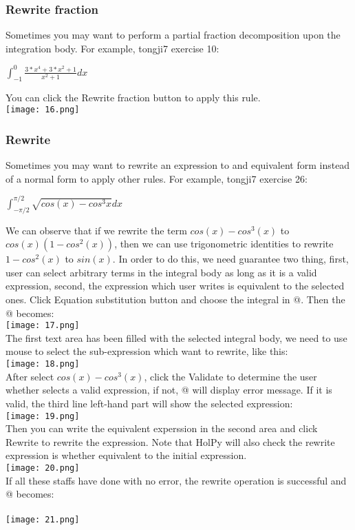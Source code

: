 \documentclass[titlepage]{article}
\makeatletter
\newcommand*{\rom}[1]{\expandafter\@slowromancap\romannumeral #1@}
\makeatother
\begin{document}
\subsubsection{Rewrite fraction}
Sometimes you may want to perform a partial fraction decomposition upon the integration body. For example, tongji7 exercise 10:
\begin{center}
$\int_{-1}^{0} \frac{3*x^4 + 3*x^2 + 1}{x^2 + 1} dx$
\end{center}
You can click the \colorbox{mygray}{Rewrite fraction} button to apply this rule.\\
\texttt{[image: 16.png]}
\subsubsection{Rewrite}
Sometimes you may want to rewrite an expression to and equivalent form instead of a normal form to apply other rules. For example, tongji7 exercise 26:
\begin{center}
$\int_{-\pi/2}^{\pi/2} \sqrt{cos(x) - cos^{3}x} dx$
\end{center}
We can observe that if we rewrite the term $cos(x) - cos^{3}(x)$ to $cos(x)(1 - cos^{2}(x))$, then we can use trigonometric identities to rewrite $1-cos^{2}(x)$ to $sin(x)$. In order to do this, we need guarantee two thing, first, user can select arbitrary terms in the integral body as long as it is a valid expression, second, the expression which user writes is equivalent to the selected ones. Click \colorbox{mygray}{Equation substitution} button and choose the integral in \rom{4}. Then the \rom{5} becomes:\\
\texttt{[image: 17.png]}\\
The first text area has been filled with the selected integral body, we need to use mouse to select the sub-expression which want to rewrite, like this:\\
\texttt{[image: 18.png]}\\
After select $cos(x) - cos^{3}(x)$, click the \colorbox{mygray}{Validate} to determine the user whether selects a valid expression, if not, \rom{5} will display error message. If it is valid, the third line left-hand part will show the selected expression:\\
\texttt{[image: 19.png]}\\
Then you can write the equivalent experssion in the second area and click \colorbox{mygray}{Rewrite} to rewrite the expression. Note that HolPy will also check the rewrite expression is whether equivalent to the initial expression. \\
\texttt{[image: 20.png]}\\
If all these staffs have done with no error, the rewrite operation is successful and \rom{3} becomes:\\\\
\texttt{[image: 21.png]}\\
\end{document}
